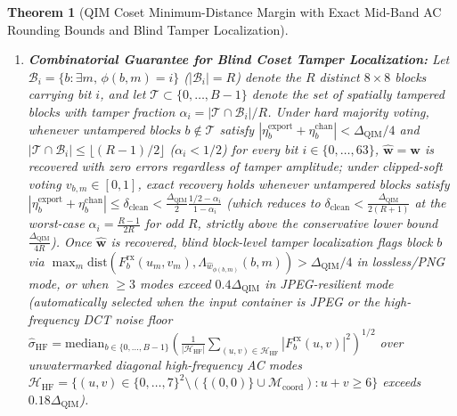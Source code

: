 \documentclass[conference,10pt]{IEEEtran}
\newtheorem{theorem}{Theorem}
\begin{document}
\begin{theorem}[QIM Coset Minimum-Distance Margin with Exact Mid-Band AC Rounding Bounds and Blind Tamper Localization]
\begin{enumerate}
    \item \textbf{Combinatorial Guarantee for Blind Coset Tamper Localization:} Let $\mathcal{B}_i = \{b : \exists m,\, \phi(b,m) = i\}$ ($|\mathcal{B}_i| = R$) denote the $R$ distinct $8\times 8$ blocks carrying bit $i$, and let $\mathcal{T} \subset \{0, \dots, B-1\}$ denote the set of spatially tampered blocks with tamper fraction $\alpha_i = |\mathcal{T} \cap \mathcal{B}_i|/R$. Under hard majority voting, whenever untampered blocks $b \notin \mathcal{T}$ satisfy $|\eta^{\text{export}}_b + \eta^{\text{chan}}_b| < \Delta_{\text{QIM}}/4$ and $|\mathcal{T} \cap \mathcal{B}_i| \le \lfloor (R-1)/2 \rfloor$ ($\alpha_i < 1/2$) for every bit $i \in \{0, \dots, 63\}$, $\hat{\mathbf{w}} = \mathbf{w}$ is recovered with zero errors regardless of tamper amplitude; under clipped-soft voting $v_{b,m} \in [0, 1]$, exact recovery holds whenever untampered blocks satisfy $|\eta^{\text{export}}_b + \eta^{\text{chan}}_b| \le \delta_{\text{clean}} < \frac{\Delta_{\text{QIM}}}{2}\frac{1/2 - \alpha_i}{1 - \alpha_i}$ (which reduces to $\delta_{\text{clean}} < \frac{\Delta_{\text{QIM}}}{2(R+1)}$ at the worst-case $\alpha_i = \frac{R-1}{2R}$ for odd $R$, strictly above the conservative lower bound $\frac{\Delta_{\text{QIM}}}{4R}$). Once $\hat{\mathbf{w}}$ is recovered, blind block-level tamper localization flags block $b$ via $\max_{m} \mathrm{dist}(F^{\text{rx}}_b(u_m, v_m), \Lambda_{\hat{w}_{\phi(b,m)}}(b,m)) > \Delta_{\text{QIM}}/4$ in lossless/PNG mode, or when $\ge 3$ modes exceed $0.4\Delta_{\text{QIM}}$ in JPEG-resilient mode (automatically selected when the input container is JPEG or the high-frequency DCT noise floor $\hat{\sigma}_{\text{HF}} = \mathrm{median}_{b \in \{0,\dots,B-1\}}\!\left(\frac{1}{|\mathcal{H}_{\text{HF}}|}\sum_{(u,v)\in\mathcal{H}_{\text{HF}}} |F^{\text{rx}}_b(u,v)|^2\right)^{1/2}$ over unwatermarked diagonal high-frequency AC modes $\mathcal{H}_{\text{HF}} = \{(u,v) \in \{0,\dots,7\}^2 \setminus (\{(0,0)\} \cup \mathcal{M}_{\text{coord}}) : u + v \ge 6\}$ exceeds $0.18\Delta_{\text{QIM}}$).
\end{enumerate}
\end{theorem}
\end{document}
